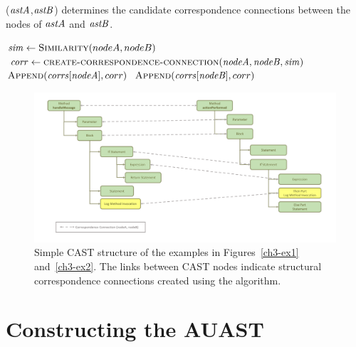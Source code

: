 \begin{algorithm}
  \caption{($\mathit{astA}$,$\mathit{astB}$) determines the candidate correspondence connections between the nodes of $\mathit{astA}$ and $\mathit{astB}$.}
  \label{computeMatches}
  \begin{algorithmic}[1]
  \DeterminePotentialCorrespondences
		
		\State $\mathit{sim} \gets \textsc{Similarity}(nodeA,nodeB)$	
 		\State $\mathit{corr} \gets \textsc{create-correspondence-connection}(\mathit{nodeA},\mathit{nodeB},\mathit{sim})$	
 \State $\textsc{Append}(\mathit{corrs}[\mathit{nodeA}],corr)$	
 \State $\textsc{Append}(\mathit{corrs}[\mathit{nodeB}],corr)$
 		\EndIf 		
 \EndFor 	
	  \EndFor 	
	
  \end{algorithmic}
\end{algorithm}



\begin{figure} [H]  \centering\includegraphics [width = \textwidth]{Drawing4/FirstCorr.pdf}
  \caption[Simple CAST structure of the examples in Figures~\ref{ch3-ex1} and~\ref{ch3-ex2}.]{Simple CAST structure of the examples in Figures~\ref{ch3-ex1} and~\ref{ch3-ex2}. The links between CAST nodes indicate structural correspondence connections created using the  algorithm.}
  \label{fig:meth-ast-1}
\end{figure}

\section{Constructing the AUAST}  \label{jigsaw-corr}

